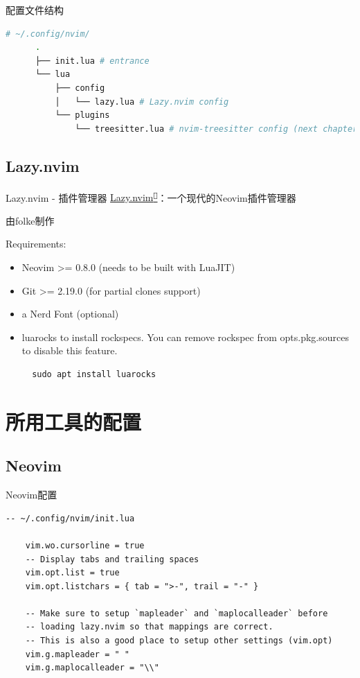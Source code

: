 \documentclass[aspectratio=169]{ctexbeamer}
\newcommand{\nerd}[1]{\texttt{#1}}
\newcommand{\link}[3][]{\href{#3}{#2\textsuperscript{\nerd{}}}}
\begin{document}
    \begin{frame}[containsverbatim]{配置文件结构}
      \begin{lstlisting}[language=bash]
      # ~/.config/nvim/
      .
      ├── init.lua # entrance
      └── lua
          ├── config
          │   └── lazy.lua # Lazy.nvim config
          └── plugins
              └── treesitter.lua # nvim-treesitter config (next chapter)
      \end{lstlisting}

    \end{frame}

  \subsection{Lazy.nvim}
    \begin{frame}[containsverbatim]{Lazy.nvim - 插件管理器}
      \link{Lazy.nvim}{https://github.com/folke/lazy.nvim}：一个现代的Neovim插件管理器

      由folke制作

      Requirements:
      \begin{itemize}
        \item Neovim >= 0.8.0 (needs to be built with LuaJIT)
        \item Git >= 2.19.0 (for partial clones support)
        \item a Nerd Font (optional)
        \item luarocks to install rockspecs. You can remove rockspec from opts.pkg.sources to disable this feature.
          \begin{lstlisting}
  sudo apt install luarocks
          \end{lstlisting}
      \end{itemize}

    \end{frame}

\section{所用工具的配置}
  \subsection{Neovim}
    \begin{frame}[fragile]{Neovim配置}
      \begin{lstlisting}[language={[5.1]lua}]
    -- ~/.config/nvim/init.lua

    vim.wo.cursorline = true
    -- Display tabs and trailing spaces
    vim.opt.list = true
    vim.opt.listchars = { tab = ">-", trail = "-" }

    -- Make sure to setup `mapleader` and `maplocalleader` before
    -- loading lazy.nvim so that mappings are correct.
    -- This is also a good place to setup other settings (vim.opt)
    vim.g.mapleader = " "
    vim.g.maplocalleader = "\\"
      \end{lstlisting}
    \end{frame}
\end{document}
